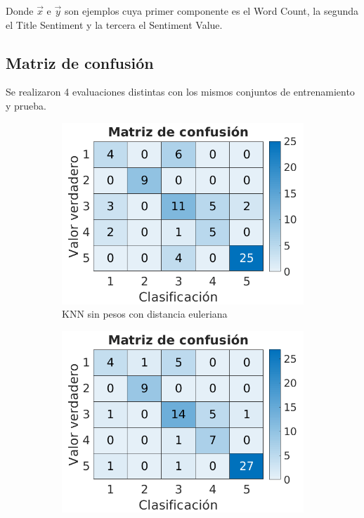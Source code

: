 \documentclass[a4paper]{article}
\begin{document}
Donde $\vec{x}$ e $\vec{y}$ son ejemplos cuya primer componente es el Word Count, la segunda el Title Sentiment y la tercera el Sentiment Value.

\subsection{Matriz de confusión}

Se realizaron 4 evaluaciones distintas con los mismos conjuntos de entrenamiento y prueba.

\begin{figure}[h]
  \centering
  \begin{subfigure}{.4\textwidth}
    \centering
    \includegraphics[width=\linewidth]{img/cm-eul.png}
    \caption{KNN sin pesos con distancia euleriana}
    \label{sent-cm:sfig1}
  \end{subfigure}%
  \begin{subfigure}{.4\textwidth}
    \centering
    \includegraphics[width=\linewidth]{img/cm-cust.png}

\end{subfigure}
\end{figure}
\end{document}
